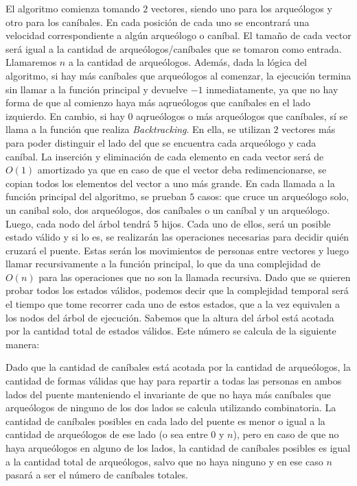       El algoritmo comienza tomando $2$ vectores, siendo uno para los arqueólogos y otro para los caníbales. En cada posición de cada uno se encontrará una velocidad correspondiente a algún arqueólogo o caníbal. El tamaño de cada vector será igual a la cantidad de arqueólogos/caníbales que se tomaron como entrada. Llamaremos $n$ a la cantidad de arqueólogos. Además, dada la lógica del algoritmo, si hay más caníbales que arqueólogos al comenzar, la ejecución termina sin llamar a la función principal y devuelve $-1$ inmediatamente, ya que no hay forma de que al comienzo haya más aqrueólogos que caníbales en el lado izquierdo. En cambio, si hay $0$ aqrueólogos o más arqueólogos que caníbales, sí se llama a la función que realiza \emph{Backtracking}.
      En ella, se utilizan $2$ vectores más para poder distinguir el lado del que se encuentra cada arqueólogo y cada caníbal. La inserción y eliminación de cada elemento en cada vector será de $O(1)$ amortizado ya que en caso de que el vector deba redimencionarse, se copian todos los elementos del vector a uno más grande.
      En cada llamada a la función principal del algoritmo, se prueban $5$ casos: que cruce un arqueólogo solo, un canibal solo, dos arqueólogos, dos caníbales o un caníbal y un arqueólogo. Luego, cada nodo del árbol tendrá 5 hijos. Cada uno de ellos, será un posible estado válido y si lo es, se realizarán las operaciones necesarias para decidir quién cruzará el puente. Estas serán los movimientos de personas entre vectores y luego llamar recursivamente a la función principal, lo que da una complejidad de $O(n)$ para las operaciones que no son la llamada recursiva. Dado que se quieren probar todos los estados válidos, podemos decir que la complejidad temporal será el tiempo que tome recorrer cada uno de estos estados, que a la vez equivalen a los nodos del árbol de ejecución. Sabemos que la altura del árbol está acotada por la cantidad total de estados válidos. Este número se calcula de la siguiente manera:

      Dado que la cantidad de caníbales está acotada por la cantidad de arqueólogos, la cantidad de formas válidas que hay para repartir a todas las personas en ambos lados del puente manteniendo el invariante de que no haya más caníbales que arqueólogos de ninguno de los dos lados se calcula utilizando combinatoria. La cantidad de caníbales posibles en cada lado del puente es menor o igual a la cantidad de arqueólogos de ese lado (o sea entre $0$ y $n$), pero en caso de que no haya arqueólogos en alguno de los lados, la cantidad de caníbales posibles es igual a la cantidad total de arqueólogos, salvo que no haya ninguno y en ese caso $n$ pasará a ser el número de caníbales totales.

